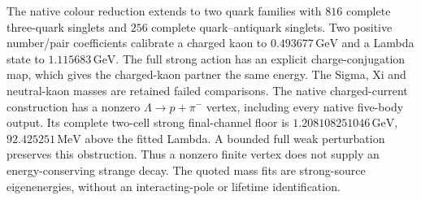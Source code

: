 The native colour reduction extends to two quark families with $816$
complete three-quark singlets and $256$ complete quark--antiquark singlets.
Two positive number/pair coefficients calibrate a charged kaon to
$0.493677\,\mathrm{GeV}$ and a Lambda state to $1.115683\,\mathrm{GeV}$.
The full strong action has an explicit charge-conjugation map, which gives
the charged-kaon partner the same energy. The Sigma, Xi and neutral-kaon
masses are retained failed comparisons. The native charged-current
construction has a nonzero $\Lambda\to p+\pi^-$ vertex, including every
native five-body output. Its complete two-cell strong final-channel floor
is $1.208108251046\,\mathrm{GeV}$, $92.425251\,\mathrm{MeV}$ above the
fitted Lambda. A bounded full weak perturbation preserves this obstruction.
Thus a nonzero finite vertex does not supply an energy-conserving strange
decay. The quoted mass fits are strong-source eigenenergies, without an
interacting-pole or lifetime identification.

